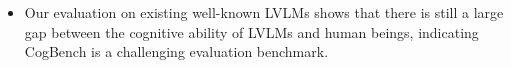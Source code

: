 \begin{itemize}
    
	\item 
Our evaluation on existing well-known LVLMs shows that there is still a large gap between the cognitive ability of LVLMs and human beings, indicating CogBench is a challenging evaluation benchmark.
	

\end{itemize}

